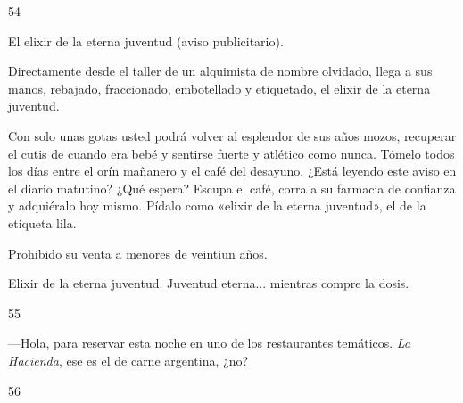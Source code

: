 \documentclass[12pt,twoside,openright,a5paper]{book}
\begin{document}
\vspace{0.5cm}

\hrulefill \hspace{0.1cm}\decofourleft\hspace{0.2cm} 54 \hspace{0.2cm}\decofourright \hspace{0.1cm}\hrulefill

\nopagebreak

\vspace{0.5cm}

\nopagebreak

El elixir de la eterna juventud (aviso publicitario).

Directamente desde el taller de un alquimista de nombre olvidado, llega a
sus manos, rebajado, fraccionado, embotellado y etiquetado, el elixir de
la eterna juventud.

Con solo unas gotas usted podrá volver al esplendor de sus años mozos,
recuperar el cutis de cuando era bebé y sentirse fuerte y atlético
como nunca. Tómelo todos los días entre el orín mañanero y el café
del desayuno.  ¿Está leyendo este aviso en el diario matutino? ¿Qué
espera? Escupa el café, corra a su farmacia de confianza y adquiéralo hoy
mismo. Pídalo como «elixir de la eterna juventud», el de la etiqueta lila.

Prohibido su venta a menores de veintiun años.

Elixir de la eterna juventud. Juventud eterna... mientras compre la dosis.

\vspace{0.5cm}

\hrulefill \hspace{0.1cm}\decofourleft\hspace{0.2cm} 55 \hspace{0.2cm}\decofourright \hspace{0.1cm}\hrulefill

\nopagebreak

\vspace{0.5cm}

\nopagebreak

---Hola, para reservar esta noche en uno de los restaurantes temáticos. 
\emph{La Hacienda}, ese es el de carne argentina, ¿no?

\vspace{0.5cm}

\hrulefill \hspace{0.1cm}\decofourleft\hspace{0.2cm} 56 \hspace{0.2cm}\decofourright \hspace{0.1cm}\hrulefill
\end{document}
